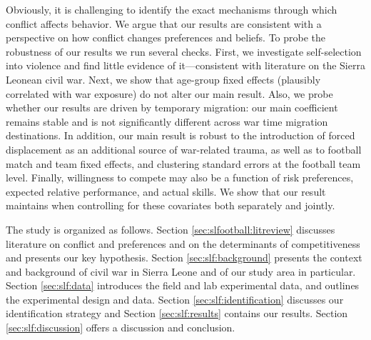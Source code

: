 Obviously, it is challenging to identify the exact mechanisms through which conflict affects behavior. We argue that our results are consistent with a perspective on how conflict changes preferences and beliefs. To probe the robustness of our results we run several checks. First, we investigate self-selection into violence and find little evidence of it—consistent with literature on the Sierra Leonean civil war. Next, we show that age-group fixed effects (plausibly correlated with war exposure) do not alter our main result. Also, we probe whether our results are driven by temporary migration: our main coefficient remains stable and is not significantly different across war time migration destinations. In addition, our main result is robust to the introduction of forced displacement as an additional source of war-related trauma, as well as to football match and team fixed effects, and clustering standard errors at the football team level. Finally, willingness to compete may also be a function of risk preferences, expected relative performance, and actual skills. We show that our result maintains when controlling for these covariates both separately and jointly.

The study is organized as follows. Section \ref{sec:slfootball:litreview} discusses literature on conflict and preferences and on the determinants of competitiveness and presents our key hypothesis. Section \ref{sec:slf:background} presents the context and background of civil war in Sierra Leone and of our study area in particular. Section \ref{sec:slf:data} introduces the field and lab experimental data, and outlines the experimental design and data. Section \ref{sec:slf:identification} discusses our identification strategy and Section \ref{sec:slf:results} contains our results. Section \ref{sec:slf:discussion} offers a discussion and conclusion.


